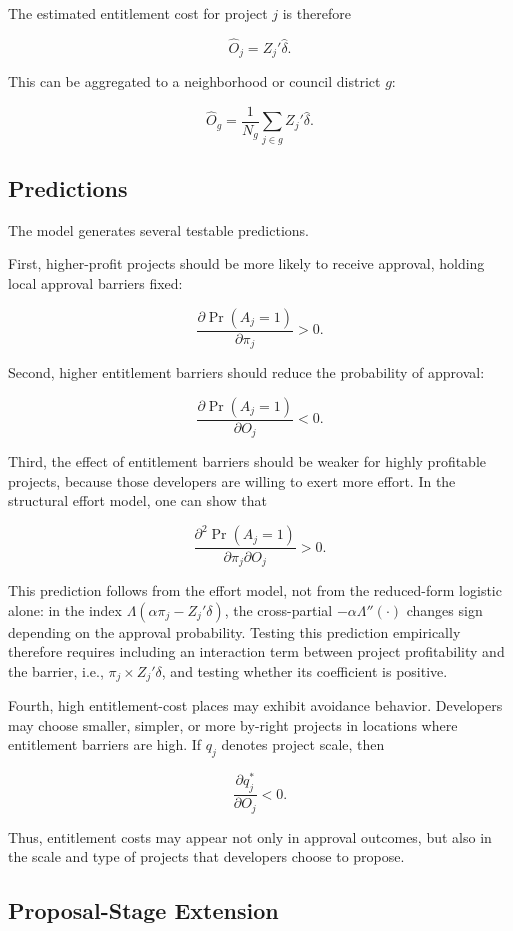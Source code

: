 \documentclass[12pt]{article}
\theoremstyle{definition}
\begin{document}
The estimated entitlement cost for project $j$ is therefore

\[
\widehat{O}_j = Z_j'\widehat{\delta}.
\]

This can be aggregated to a neighborhood or council district $g$:

\[
\widehat{O}_g
=
\frac{1}{N_g}
\sum_{j \in g}
Z_j'\widehat{\delta}.
\]

\subsection{Predictions}

The model generates several testable predictions.

First, higher-profit projects should be more likely to receive approval, holding local approval barriers fixed:

\[
\frac{\partial \Pr(A_j=1)}{\partial \pi_j} > 0.
\]

Second, higher entitlement barriers should reduce the probability of approval:

\[
\frac{\partial \Pr(A_j=1)}{\partial O_j} < 0.
\]

Third, the effect of entitlement barriers should be weaker for highly profitable projects, because those developers are willing to exert more effort. In the structural effort model, one can show that

\[
\frac{\partial^2 \Pr(A_j=1)}
{\partial \pi_j \partial O_j}
> 0.
\]

This prediction follows from the effort model, not from the reduced-form logistic alone: in the index $\Lambda(\alpha\pi_j - Z_j'\delta)$, the cross-partial $-\alpha\Lambda''(\cdot)$ changes sign depending on the approval probability. Testing this prediction empirically therefore requires including an interaction term between project profitability and the barrier, i.e., $\pi_j \times Z_j'\delta$, and testing whether its coefficient is positive.

Fourth, high entitlement-cost places may exhibit avoidance behavior. Developers may choose smaller, simpler, or more by-right projects in locations where entitlement barriers are high. If $q_j$ denotes project scale, then

\[
\frac{\partial q_j^*}{\partial O_j} < 0.
\]

Thus, entitlement costs may appear not only in approval outcomes, but also in the scale and type of projects that developers choose to propose.

\subsection{Proposal-Stage Extension}
\end{document}
